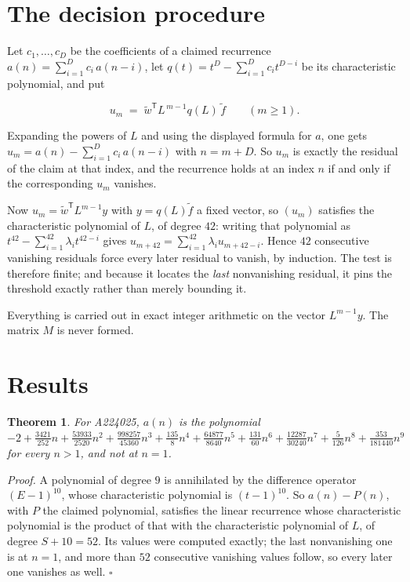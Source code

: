 \documentclass[11pt]{article}
\newtheorem{theorem}{Theorem}
\theoremstyle{definition}
\begin{document}
\section{The decision procedure}

Let $c_1,\dots,c_D$ be the coefficients of a claimed recurrence $a(n) = \sum_{i=1}^{D} c_i\,a(n-i)$, let $q(t) = t^{D} - \sum_{i=1}^{D} c_i t^{D-i}$ be its characteristic polynomial, and put

\[u_m \;=\; \tilde w^{\mathsf T} L^{\,m-1} q(L)\,\tilde f \qquad (m \ge 1).\]

Expanding the powers of $L$ and using the displayed formula for $a$, one gets $u_m = a(n) - \sum_{i=1}^{D} c_i\,a(n-i)$ with $n = m + D$. So $u_m$ is exactly the residual of the claim at that index, and the recurrence holds at an index $n$ if and only if the corresponding $u_m$ vanishes.

Now $u_m = \tilde w^{\mathsf T} L^{m-1} y$ with $y = q(L)\tilde f$ a fixed vector, so $(u_m)$ satisfies the characteristic polynomial of $L$, of degree $42$: writing that polynomial as $t^{42} - \sum_{i=1}^{42} \lambda_i t^{42-i}$ gives $u_{m+42} = \sum_{i=1}^{42} \lambda_i u_{m+42-i}$. Hence $42$ consecutive vanishing residuals force every later residual to vanish, by induction. The test is therefore finite; and because it locates the {\itshape last} nonvanishing residual, it pins the threshold exactly rather than merely bounding it.

Everything is carried out in exact integer arithmetic on the vector $L^{m-1}y$. The matrix $M$ is never formed.

\section{Results}

\begin{theorem} For A224025, $a(n)$ is the polynomial $-2 + \frac{3421}{252}n + \frac{53933}{2520}n^{2} + \frac{998257}{45360}n^{3} + \frac{135}{8}n^{4} + \frac{64877}{8640}n^{5} + \frac{131}{60}n^{6} + \frac{12287}{30240}n^{7} + \frac{5}{126}n^{8} + \frac{353}{181440}n^{9}$ for every $n > 1$, and not at $n = 1$.\end{theorem}

{\itshape Proof.} A polynomial of degree $9$ is annihilated by the difference operator $(E-1)^{10}$, whose characteristic polynomial is $(t-1)^{10}$. So $a(n) - P(n)$, with $P$ the claimed polynomial, satisfies the linear recurrence whose characteristic polynomial is the product of that with the characteristic polynomial of $L$, of degree $S + 10 = 52$. Its values were computed exactly; the last nonvanishing one is at $n = 1$, and more than $52$ consecutive vanishing values follow, so every later one vanishes as well. $\square$
\end{document}

